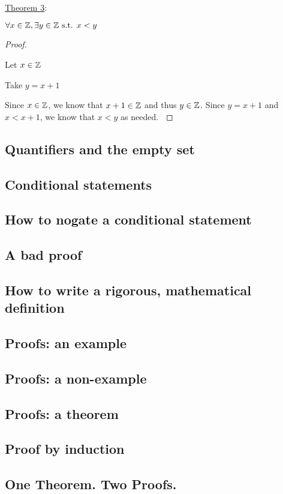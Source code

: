 \underline{Theorem 3}:

\(\forall x \in \mathbb{Z}, \exists y \in \mathbb{Z} \text{ s.t. } x < y\)

\begin{proof} \(\)

  Let \(x \in \mathbb{Z}\)

  Take \(y = x + 1\)

  Since \(x \in \mathbb{Z}\), we know that \(x + 1 \in \mathbb{Z}\) and thus \(y \in \mathbb{Z}\). Since \(y = x + 1\) and \(x < x + 1\), we know that \(x < y\) as needed. \(\qedhere\)
\end{proof}

\subsection{Quantifiers and the empty set}

\subsection{Conditional statements}

\subsection{How to nogate a conditional statement}

\subsection{A bad proof}

\subsection{How to write a rigorous, mathematical definition}

\subsection{Proofs: an example}

\subsection{Proofs: a non-example}

\subsection{Proofs: a theorem}

\subsection{Proof by induction}

\subsection{One Theorem. Two Proofs.}
